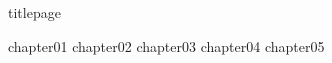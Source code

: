\documentclass[
	,a4paper
	,12pt
	,oneside
]{book}
\begin{document}
\frontmatter

	{titlepage}
	\tableofcontents

\mainmatter

	{chapter01}
	{chapter02}
	{chapter03}
	{chapter04}
	{chapter05}

\backmatter
\end{document}
